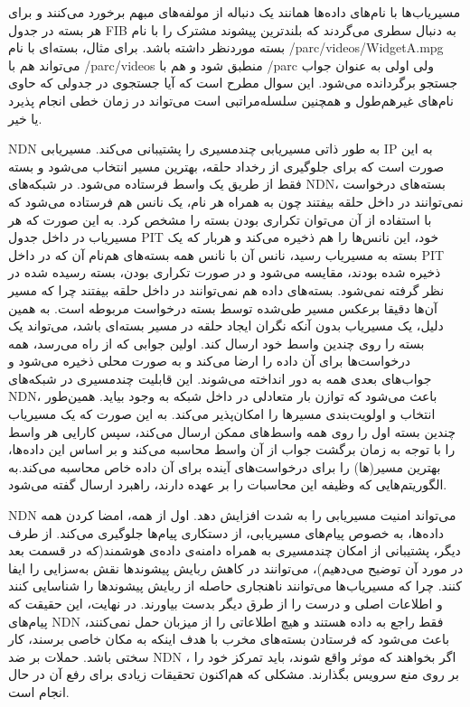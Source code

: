 مسیریاب‌ها با نام‌‌های داده‌‌ها همانند یک دنباله از مولفه‌های مبهم برخورد می‌کنند و برای هر بسته در جدول FIB به دنبال سطری می‌گردند که بلندترین پیشوند مشترک را با نام بسته موردنظر داشته باشد. برای مثال، بسته‌ای با نام /parc/videos/WidgetA.mpg می‌تواند هم با /parc/videos منطبق شود و هم با /parc ولی اولی به عنوان جواب جستجو برگردانده می‌شود.  این سوال مطرح است که آیا جستجوی در جدولی که حاوی نام‌های غیرهم‌طول و همچنین سلسله‌مراتبی است می‌تواند در زمان خطی انجام پذیرد یا خیر. 

NDN
 به طور ذاتی مسیریابی چندمسیری را پشتیبانی می‌کند. مسیریابی IP به این صورت است که برای جلوگیری از رخداد حلقه، بهترین مسیر انتخاب می‌شود و بسته فقط از طریق یک واسط فرستاده می‌شود. در شبکه‌های ‌NDN، بسته‌های درخواست نمی‌توانند در داخل حلقه بیفتند چون به همراه هر نام، یک نانس هم فرستاده می‌شود که با استفاده از آن می‌توان تکراری بودن بسته را مشخص کرد. به این صورت که هر مسیریاب در داخل جدول PIT  خود، این نانس‌ها را هم ذخیره می‌کند و هربار که یک بسته به مسیریاب رسید، نانس آن با نانس همه بسته‌‌های هم‌نام آن که در داخل PIT  ذخیره شده بودند، مقایسه می‌شود و در صورت تکراری بودن، بسته رسیده شده در نظر گرفته نمی‌شود. بسته‌های داده هم نمی‌توانند در داخل حلقه بیفتند چرا که مسیر آن‌ها دقیقا برعکس مسیر طی‌شده توسط بسته درخواست مربوطه است. به همین دلیل، یک مسیریاب بدون آنکه نگران ایجاد حلقه در مسیر بسته‌ای باشد، می‌تواند یک بسته را روی چندین واسط خود ارسال کند. اولین جوابی که از راه می‌رسد، همه درخواست‌ها برای آن داده را ارضا می‌کند و به صورت محلی ذخیره می‌شود و جواب‌های بعدی همه به دور انداخته می‌شوند. 
این قابلیت چندمسیری در شبکه‌های NDN، باعث می‌شود که توازن بار متعادلی در داخل شبکه به وجود بیاید. همین‌طور انتخاب و اولویت‌بندی مسیرها را امکان‌پذیر می‌کند. به این صورت که یک مسیریاب چندین بسته اول را روی همه واسط‌های ممکن ارسال می‌کند، سپس کارایی هر واسط را با توجه به زمان برگشت جواب از آن واسط محاسبه می‌کند و بر اساس این داده‌ها، بهترین مسیر(ها) را برای درخواست‌های آینده برای آن داده خاص محاسبه ‌می‌کند.به الگوریتم‌هایی که وظیفه این محاسبات را بر عهده دارند، راهبرد ارسال گفته می‌شود. 


NDN
می‌تواند امنیت مسیریابی را به شدت افزایش دهد. اول از همه، امضا کردن همه داده‌‌ها، به خصوص  پیام‌های مسیریابی، از دستکاری پیام‌ها جلوگیری می‌کند. از طرف دیگر، پشتیبانی از امکان چندمسیری  به همراه دامنه‌ی داده‌ی هوشمند(که در قسمت بعد در مورد آن توضیح می‌دهیم)، می‌توانند در کاهش ربایش پیشوندها نقش به‌سزایی را ایفا کنند. چرا که مسیریاب‌ها می‌توانند ناهنجاری حاصله از ربایش پیشوندها را شناسایی کنند و اطلاعات اصلی و درست را از طرق دیگر بدست بیاورند. در نهایت، این حقیقت که پیام‌های NDN  فقط راجع به داده هستند و هیچ اطلاعاتی را از میزبان حمل نمی‌کنند، باعث می‌شود که فرستادن بسته‌‌های مخرب با هدف اینکه به مکان خاصی برسند، کار سختی باشد. 
حملات بر ضد NDN ، اگر بخواهند که موثر واقع شوند، باید تمرکز خود را بر روی منع سرویس بگذارند. مشکلی که هم‌اکنون تحقیقات زیادی برای رفع آن در حال انجام است. 

